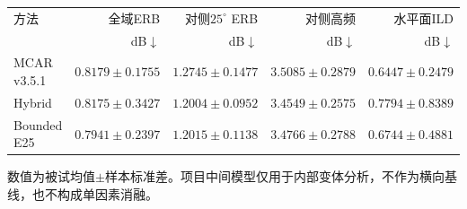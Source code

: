 \begin{table}[htbp]
\centering\small
\setlength{\tabcolsep}{3pt}
\begin{tabular}{lrrrr}
\toprule
方法 & 全域ERB & 对侧$25^\circ$ ERB & 对侧高频 & 水平面ILD\\
 & dB$\downarrow$ & dB$\downarrow$ & dB$\downarrow$ & dB$\downarrow$\\
\midrule
MCAR v3.5.1 & $0.8179 \pm 0.1755$ & $1.2745 \pm 0.1477$ & $3.5085 \pm 0.2879$ & $0.6447 \pm 0.2479$ \\
Hybrid & $0.8175 \pm 0.3427$ & $1.2004 \pm 0.0952$ & $3.4549 \pm 0.2575$ & $0.7794 \pm 0.8389$ \\
Bounded E25 & $0.7941 \pm 0.2397$ & $1.2015 \pm 0.1138$ & $3.4766 \pm 0.2788$ & $0.6744 \pm 0.4881$ \\
\bottomrule
\end{tabular}
\par\smallskip
\parbox{\linewidth}{\footnotesize 数值为被试均值$\pm$样本标准差。项目中间模型仅用于内部变体分析，不作为横向基线，也不构成单因素消融。}
\end{table}
